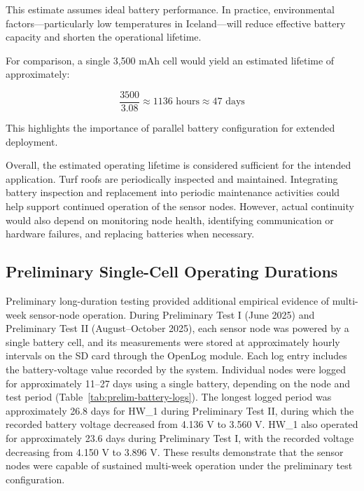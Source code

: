 This estimate assumes ideal battery performance. In practice,
environmental factors---particularly low temperatures in Iceland---will
reduce effective battery capacity and shorten the operational lifetime.

For comparison, a single 3,500 mAh cell would yield an estimated
lifetime of approximately:

\begin{equation}
\frac{3500}{3.08} \approx 1136\text{~hours} \approx 47\text{~days}
\label{eq:single-cell-lifetime}
\end{equation}

This highlights the importance of parallel battery configuration for
extended deployment.

Overall, the estimated operating lifetime is considered sufficient for the intended application. Turf roofs are periodically inspected and maintained.
Integrating battery inspection and replacement into periodic maintenance activities could help support continued operation of the sensor nodes. However, actual continuity would also depend on monitoring node health, identifying communication or hardware failures, and replacing batteries when necessary.

\subsection{Preliminary Single-Cell Operating Durations}\label{sec:prelim-battery-logs}

Preliminary long-duration testing provided additional empirical evidence of multi-week sensor-node operation. During Preliminary Test I (June 2025) and Preliminary Test II (August--October 2025), each sensor node was powered by a single battery cell, and its measurements were stored at approximately hourly intervals on the SD card through the OpenLog module. Each log entry includes the battery-voltage value recorded by the system. Individual nodes were logged for approximately 11--27 days using a single battery, depending on the node and test period (Table~\ref{tab:prelim-battery-logs}). The longest logged period was approximately 26.8 days for HW\_1 during Preliminary Test II, during which the recorded battery voltage decreased from 4.136 V to 3.560 V. HW\_1 also operated for approximately 23.6 days during Preliminary Test I, with the recorded voltage decreasing from 4.150 V to 3.896 V. These results demonstrate that the sensor nodes were capable of sustained multi-week operation under the preliminary test configuration.

